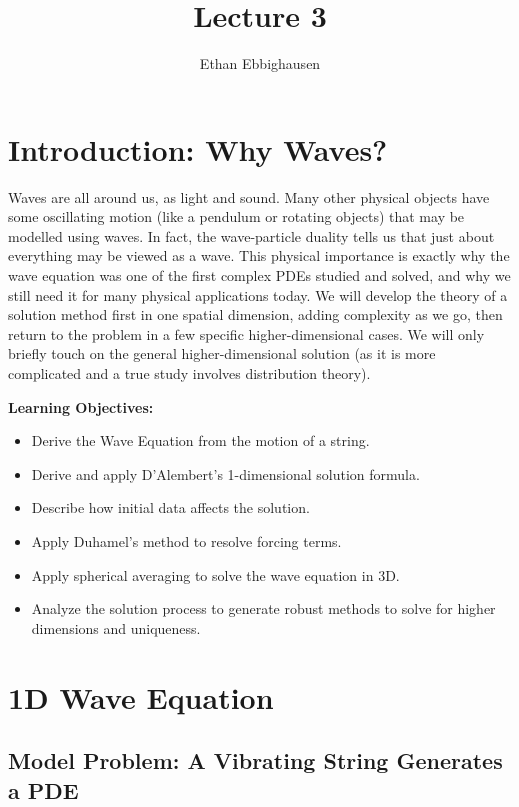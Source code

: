 \documentclass{article}
\title{Lecture 3}
\author{Ethan Ebbighausen}
\date{}
\begin{document}
	\pagestyle{fancy}
	\fancyfoot{} 
	
	\maketitle
	
	
	\section{Introduction: Why Waves?}
	
	Waves are all around us, as light and sound. Many other physical objects have some oscillating motion (like a pendulum or rotating objects) that may be modelled using waves. In fact, the wave-particle duality tells us that just about everything may be viewed as a wave. This physical importance is exactly why the wave equation was one of the first complex PDEs studied and solved, and why we still need it for many physical applications today. We will develop the theory of a solution method first in one spatial dimension, adding complexity as we go, then return to the problem in a few specific higher-dimensional cases. We will only briefly touch on the general higher-dimensional solution (as it is more complicated and a true study involves distribution theory). 
	
	
	\textbf{Learning Objectives:}
	
	\begin{itemize}
		\item Derive the Wave Equation from the motion of a string.
		\item Derive and apply D'Alembert's 1-dimensional solution formula.
		\item Describe how initial data affects the solution.
		\item Apply Duhamel's method to resolve forcing terms.
		\item Apply spherical averaging to solve the wave equation in 3D.
		\item Analyze the solution process to generate robust methods to solve for higher dimensions and uniqueness. 
	\end{itemize}
	
	
	
	\section{1D Wave Equation}
	
	\subsection{Model Problem: A Vibrating String Generates a PDE}
	
\end{document}
